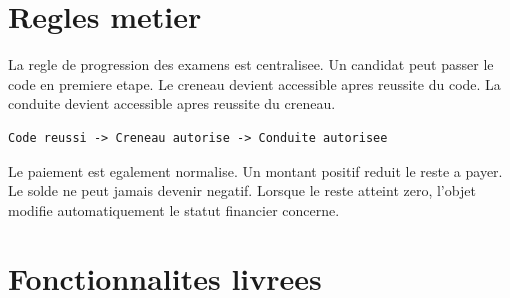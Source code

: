 \documentclass[11pt,a4paper]{article}
\begin{document}
\section{Regles metier}

La regle de progression des examens est centralisee. Un candidat peut passer le code en premiere etape. Le creneau devient accessible apres reussite du code. La conduite devient accessible apres reussite du creneau.

\begin{lstlisting}[language=PHP,caption={Principe de progression dans AutoEcoleManager}]
Code reussi -> Creneau autorise -> Conduite autorisee
\end{lstlisting}

Le paiement est egalement normalise. Un montant positif reduit le reste a payer. Le solde ne peut jamais devenir negatif. Lorsque le reste atteint zero, l'objet modifie automatiquement le statut financier concerne.

\section{Fonctionnalites livrees}
\end{document}
